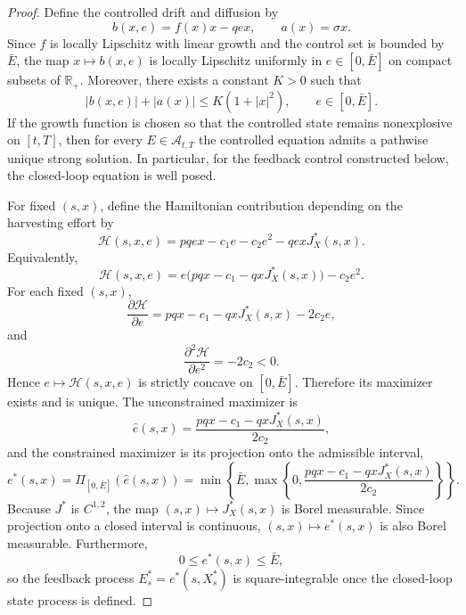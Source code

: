 \documentclass[11pt]{article}
\begin{document}
	\begin{proof}
		Define the controlled drift and diffusion by
		\[
		b(x,e)=f(x)x-qex,
		\qquad
		a(x)=\sigma x.
		\]
		Since $f$ is locally Lipschitz with linear growth and the control set is bounded by $\bar E$, the map $x\mapsto b(x,e)$ is locally Lipschitz uniformly in $e\in[0,\bar E]$ on compact subsets of $\mathbb{R}_+$. Moreover, there exists a constant $K>0$ such that
		\[
		|b(x,e)|+|a(x)|
		\le
		K(1+|x|^2),
		\qquad e\in[0,\bar E].
		\]
		If the growth function is chosen so that the controlled state remains nonexplosive on $[t,T]$, then for every $E\in\mathcal{A}_{t,T}$ the controlled equation admits a pathwise unique strong solution. In particular, for the feedback control constructed below, the closed-loop equation is well posed.
		
		For fixed $(s,x)$, define the Hamiltonian contribution depending on the harvesting effort by
		\[
		\mathcal{H}(s,x,e)
		=
		pqex-c_1e-c_2e^2-qexJ_X^*(s,x).
		\]
		Equivalently,
		\[
		\mathcal{H}(s,x,e)
		=
		e\bigl(pqx-c_1-qxJ_X^*(s,x)\bigr)-c_2e^2.
		\]
		For each fixed $(s,x)$,
		\[
		\frac{\partial \mathcal{H}}{\partial e}
		=
		pqx-c_1-qxJ_X^*(s,x)-2c_2e,
		\]
		and
		\[
		\frac{\partial^2 \mathcal{H}}{\partial e^2}
		=
		-2c_2<0.
		\]
		Hence $e\mapsto\mathcal{H}(s,x,e)$ is strictly concave on $[0,\bar E]$. Therefore its maximizer exists and is unique. The unconstrained maximizer is
		\[
		\widehat e(s,x)
		=
		\frac{pqx-c_1-qxJ_X^*(s,x)}{2c_2},
		\]
		and the constrained maximizer is its projection onto the admissible interval,
		\[
		e^*(s,x)
		=
		\Pi_{[0,\bar E]}(\widehat e(s,x))
		=
		\min
		\left\{
		\bar E,
		\max
		\left\{
		0,
		\frac{pqx-c_1-qxJ_X^*(s,x)}{2c_2}
		\right\}
		\right\}.
		\]
		Because $J^*$ is $C^{1,2}$, the map $(s,x)\mapsto J_X^*(s,x)$ is Borel measurable. Since projection onto a closed interval is continuous, $(s,x)\mapsto e^*(s,x)$ is also Borel measurable. Furthermore,
		\[
		0\le e^*(s,x)\le \bar E,
		\]
		so the feedback process $E_s^*=e^*(s,X_s^*)$ is square-integrable once the closed-loop state process is defined.
		

\end{proof}
\end{document}
